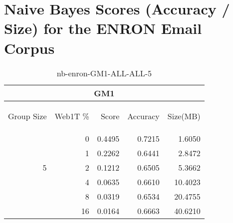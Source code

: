 \chapter{Naive Bayes Scores (Accuracy / Size) for the ENRON Email Corpus}

\begin{center}
\begin{table}[htbp]
\begin{tabular}{ | r | r | r | r | r |}
\hline
\multicolumn{5}{|c|}{GM1}\\
\hline
\begin{sideways}Group Size\end{sideways} & \begin{sideways}Web1T \%\end{sideways} & \begin{sideways}Score\end{sideways} & \begin{sideways}Accuracy\end{sideways} & \begin{sideways}Size(MB)\end{sideways}\\
\hline
\multirow{5}{*}{5}
 & 0 & 0.4495 & 0.7215 & 1.6050\\ \cline{2-5}
 & 1 & 0.2262 & 0.6441 & 2.8472\\ \cline{2-5}
 & 2 & 0.1212 & 0.6505 & 5.3662\\ \cline{2-5}
 & 4 & 0.0635 & 0.6610 & 10.4023\\ \cline{2-5}
 & 8 & 0.0319 & 0.6534 & 20.4755\\ \cline{2-5}
 & 16 & 0.0164 & 0.6663 & 40.6210\\ \cline{2-5}
\hline
\end{tabular}
\caption{nb-enron-GM1-ALL-ALL-5}
\label{table:nb-enron-GM1-ALL-ALL-5}
\end{table}
\end{center}

